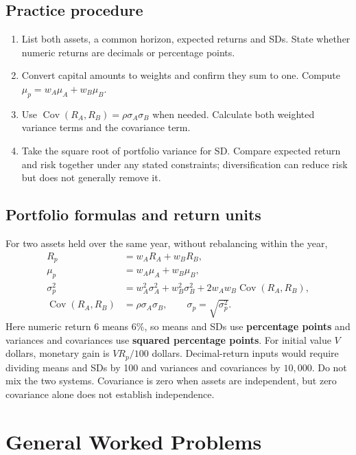 \subsection{Practice procedure}
\begin{enumerate}
\item List both assets, a common horizon, expected returns and SDs. State whether numeric returns are decimals or percentage points.
\item Convert capital amounts to weights and confirm they sum to one. Compute $\mu_p=w_A\mu_A+w_B\mu_B$.
\item Use $\operatorname{Cov}(R_A,R_B)=\rho\sigma_A\sigma_B$ when needed. Calculate both weighted variance terms and the covariance term.
\item Take the square root of portfolio variance for SD. Compare expected return and risk together under any stated constraints; diversification can reduce risk but does not generally remove it.
\end{enumerate}
\subsection{Portfolio formulas and return units}
For two assets held over the same year, without rebalancing within the year,
\[
\begin{aligned}
R_p&=w_AR_A+w_BR_B,\\
\mu_p&=w_A\mu_A+w_B\mu_B,\\
\sigma_p^2&=w_A^2\sigma_A^2+w_B^2\sigma_B^2
       +2w_Aw_B\operatorname{Cov}(R_A,R_B),\\
\operatorname{Cov}(R_A,R_B)&=\rho\sigma_A\sigma_B,\qquad
\sigma_p=\sqrt{\sigma_p^2}.
\end{aligned}
\]
Here numeric return $6$ means $6\%$, so means and SDs use \textbf{percentage points} and variances and covariances use \textbf{squared percentage points}. For initial value $V$ dollars, monetary gain is $VR_p/100$ dollars. Decimal-return inputs would require dividing means and SDs by 100 and variances and covariances by $10{,}000$. Do not mix the two systems. Covariance is zero when assets are independent, but zero covariance alone does not establish independence.
\section{General Worked Problems}\label{sec:general-worked}

